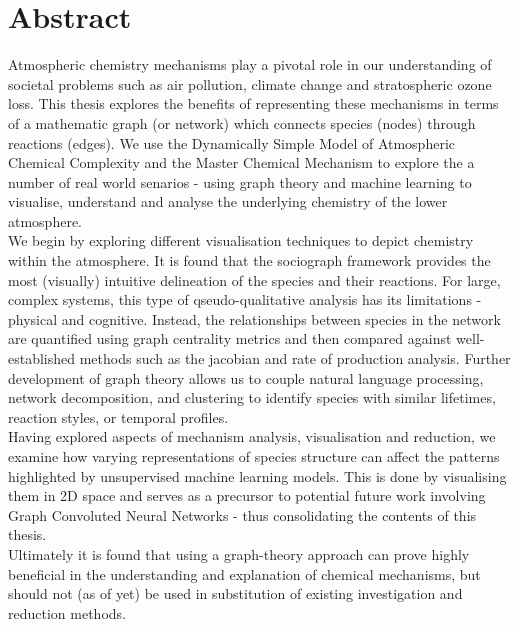 \documentclass[twoside,openleft,reqno,a4paper,final]{book}
\begin{document}
\chapter*{Abstract}
\parbox{.75\textwidth}{
Atmospheric chemistry mechanisms play a pivotal role in our understanding of societal problems such as air pollution, climate change and stratospheric ozone loss. This thesis explores the benefits of representing these mechanisms in terms of a mathematic graph (or network) which connects species (nodes) through reactions (edges). We use the Dynamically Simple Model of Atmospheric Chemical Complexity and the Master Chemical Mechanism to explore the a number of real world senarios - using graph theory and machine learning to visualise, understand and analyse the underlying chemistry of the lower atmosphere.\\

We begin by exploring different visualisation techniques to depict chemistry within the atmosphere. It is found that the sociograph framework provides the most (visually) intuitive delineation of the species and their reactions. For large, complex systems, this type of qseudo-qualitative analysis has its limitations - physical and cognitive. Instead, the relationships between species in the network are quantified using graph centrality metrics and then compared against well-established methods such as the jacobian and rate of production analysis. Further development of graph theory allows us to couple natural language processing, network decomposition, and clustering to identify species with similar lifetimes, reaction styles, or temporal profiles. \\

Having explored aspects of mechanism analysis, visualisation and reduction, we examine how varying representations of species structure can affect the patterns highlighted by unsupervised machine learning models. This is done by visualising them in 2D space and serves as a precursor to potential future work involving Graph Convoluted Neural Networks - thus consolidating the contents of this thesis.\\

Ultimately it is found that using a graph-theory approach can prove highly beneficial in the understanding and explanation of chemical mechanisms, but should not (as of yet) be used in substitution of existing investigation and reduction methods.\\

}
\end{document}
